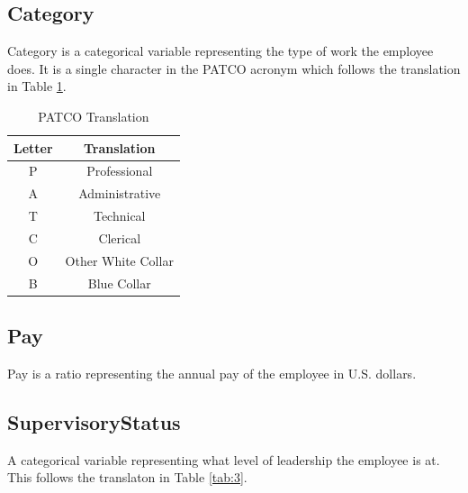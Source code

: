 \documentclass{article}
\begin{document}
    \subsection{Category}
    Category is a categorical variable representing the type of work the employee does. It is a single character in the PATCO acronym which follows the translation in Table \ref{tab:2}.

        \begin{center}
            \begin{table}
                \centering
                \begin{tabular}{ |c|c| }
                    \hline
                    Letter & Translation \\
                    \hline
                    P & Professional \\
                    A & Administrative \\
                    T & Technical \\
                    C & Clerical \\
                    O & Other White Collar \\
                    B & Blue Collar \\
                    \hline
                \end{tabular}
                \caption{PATCO Translation}
                \label{tab:2}
            \end{table}
        \end{center}

    \subsection{Pay}
    Pay is a ratio representing the annual pay of the employee in U.S. dollars.

    \subsection{SupervisoryStatus}
    A categorical variable representing what level of leadership the employee is at. This follows the translaton in Table \ref{tab:3}.
\end{document}

